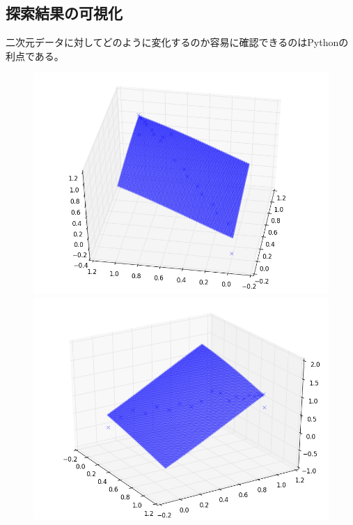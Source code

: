 \documentclass[]{jsarticle}
\begin{document}
\subsection{探索結果の可視化}
二次元データに対してどのように変化するのか容易に確認できるのはPythonの利点である。
\begin{figure}[htbp]
 \begin{minipage}[b]{0.5\hsize}
  \includegraphics[scale=0.4]{./images/gauss_sq.png}
 \end{minipage}
 \begin{minipage}[b]{0.5\hsize}
  \includegraphics[scale=0.4]{./images/gauss_abs.png}

\end{minipage}
\end{figure}
\end{document}
